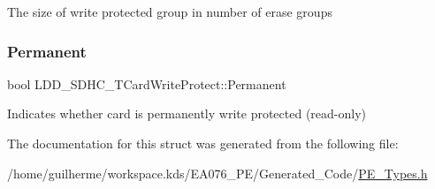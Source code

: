 The size of write protected group in number of erase groups \mbox{\label{struct_l_d_d___s_d_h_c___t_card_write_protect_aff6b0178087c770234bd68974d643552}} 
\subsubsection{\texorpdfstring{Permanent}{Permanent}}
{\footnotesize\ttfamily bool L\+D\+D\+\_\+\+S\+D\+H\+C\+\_\+\+T\+Card\+Write\+Protect\+::\+Permanent}

Indicates whether card is permanently write protected (read-\/only) 

The documentation for this struct was generated from the following file\+:\begin{DoxyCompactItemize}
\item 
/home/guilherme/workspace.\+kds/\+E\+A076\+\_\+\+P\+E/\+Generated\+\_\+\+Code/\hyperlink{_p_e___types_8h}{P\+E\+\_\+\+Types.\+h}\end{DoxyCompactItemize}
